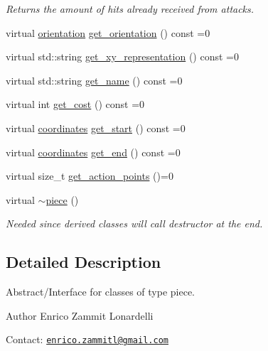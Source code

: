 \begin{DoxyCompactItemize}
\begin{DoxyCompactList}\small\item\em Returns the amount of hits already received from attacks. \end{DoxyCompactList}\item 
virtual \hyperlink{namespacebattle__ship_aed87488f0a73f0d0679fe343fb61c784}{orientation} \hyperlink{classbattle__ship_1_1piece_a2cc01b1ec66bfb91df048401233e9618}{get\+\_\+orientation} () const =0
\item 
virtual std\+::string \hyperlink{classbattle__ship_1_1piece_ad589faff3ce07b5130bfdd89da4269c1}{get\+\_\+xy\+\_\+representation} () const =0
\item 
virtual std\+::string \hyperlink{classbattle__ship_1_1piece_a95531d660360ffc403a742db1b4f6413}{get\+\_\+name} () const =0
\item 
virtual int \hyperlink{classbattle__ship_1_1piece_a9193782bce8a697bd5d3cb391d5f1623}{get\+\_\+cost} () const =0
\item 
virtual \hyperlink{structbattle__ship_1_1coordinates}{coordinates} \hyperlink{classbattle__ship_1_1piece_ab5010cea30b96f5afc758b2a9d0d43bc}{get\+\_\+start} () const =0
\item 
virtual \hyperlink{structbattle__ship_1_1coordinates}{coordinates} \hyperlink{classbattle__ship_1_1piece_a4f7ac17a3ba66f104d2c5110e0fe51d4}{get\+\_\+end} () const =0
\item 
virtual size\+\_\+t \hyperlink{classbattle__ship_1_1piece_a63f00d666a65cd41a11b592d55411b7f}{get\+\_\+action\+\_\+points} ()=0
\item 
virtual \hyperlink{classbattle__ship_1_1piece_a935d8c078457ff4327d83cc8fb43b06c}{$\sim$piece} ()
\begin{DoxyCompactList}\small\item\em Needed since derived classes will call destructor at the end. \end{DoxyCompactList}\end{DoxyCompactItemize}


\subsection{Detailed Description}
Abstract/\+Interface for classes of type piece. 

\begin{DoxyAuthor}{Author}
Enrico Zammit Lonardelli
\end{DoxyAuthor}
Contact\+: \href{mailto:enrico.zammitl@gmail.com}{\tt enrico.\+zammitl@gmail.\+com}

